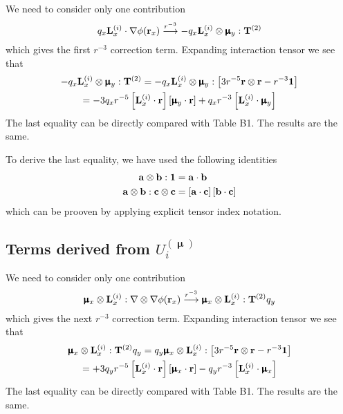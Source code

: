 \documentclass{exam}
\begin{document}
\begin{questions}
\begin{solution}
We need to consider only one contribution
%
\begin{equation}
 q_x {\bf L}_x^{(i)} \cdot \nabla\phi({\bf r}_x) \overset{r^{-3}}{\longrightarrow}
 - q_x {\bf L}_x^{(i)} \otimes \pmb{\upmu}_y : {\bf T}^{(2)}
\end{equation}
%
which gives the first $r^{-3}$ correction term. Expanding interaction tensor
we see that
%
\begin{multline}
 - q_x {\bf L}_x^{(i)} \otimes \pmb{\upmu}_y : {\bf T}^{(2)} = 
 - q_x {\bf L}_x^{(i)} \otimes \pmb{\upmu}_y : \left[
 3 r^{-5} {\bf r}\otimes {\bf r}  - r^{-3} {\bf 1}
\right]
  \\  =   %
 -3 q_x r^{-5} \left[ {\bf L}_x^{(i)} \cdot {\bf r} \right] 
               \left[ \pmb{\upmu}_y \cdot {\bf r} \right] 
 + 
 q_x r^{-3} \left[ {\bf L}_x^{(i)} \cdot  \pmb{\upmu}_y \right] 
\end{multline}
%
The last equality can be directly compared with Table B1. The results are the same.

To derive the last equality, we have used the following identities
%
\begin{subequations}
\begin{align}
 {\bf a} \otimes {\bf b} : {\bf 1} &= {\bf a} \cdot {\bf b}\\
 {\bf a} \otimes {\bf b} : {\bf c} \otimes {\bf c} &= 
\left[ {\bf a} \cdot {\bf c} \right] \left[ {\bf b} \cdot {\bf c} \right]
\end{align}
\end{subequations}
%
which can be prooven by applying explicit tensor index notation.

\subsection{Terms derived from $U_i^{(\pmb{\upmu})}$}

We need to consider only one contribution
%
\begin{equation}
 \pmb{\upmu}_x \otimes {\bf L}_x^{(i)} : \nabla\otimes\nabla\phi({\bf r}_x) \overset{r^{-3}}{\longrightarrow}
 \pmb{\upmu}_x \otimes {\bf L}_x^{(i)} : {\bf T}^{(2)} q_y
\end{equation}
%
which gives the next $r^{-3}$ correction term. Expanding interaction tensor
we see that
%
\begin{multline}
 \pmb{\upmu}_x \otimes {\bf L}_x^{(i)} : {\bf T}^{(2)} q_y = 
q_y \pmb{\upmu}_x \otimes {\bf L}_x^{(i)} : \left[
 3 r^{-5} {\bf r}\otimes {\bf r}  - r^{-3} {\bf 1}
\right]
  \\  =   %
 +3 q_y r^{-5} \left[ {\bf L}_x^{(i)} \cdot {\bf r} \right] 
               \left[ \pmb{\upmu}_x \cdot {\bf r} \right] 
 - 
 q_y r^{-3} \left[ {\bf L}_x^{(i)} \cdot  \pmb{\upmu}_x \right] 
\end{multline}
%
The last equality can be directly compared with Table B1. The results are the same.


\end{solution}
\end{questions}
\end{document}
